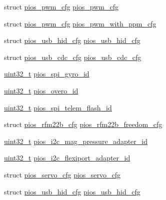 \begin{DoxyCompactItemize}
\item 
struct \hyperlink{structpios__pwm__cfg}{pios\-\_\-pwm\-\_\-cfg} \hyperlink{group___tau_labs_core_ga7587f8e174df90bef8cec1edfa9e14c1}{pios\-\_\-pwm\-\_\-cfg}
\item 
struct \hyperlink{structpios__pwm__cfg}{pios\-\_\-pwm\-\_\-cfg} \hyperlink{group___tau_labs_core_ga6a7a8338c617f18384f3b3c5678f5505}{pios\-\_\-pwm\-\_\-with\-\_\-ppm\-\_\-cfg}
\item 
struct \hyperlink{structpios__usb__hid__cfg}{pios\-\_\-usb\-\_\-hid\-\_\-cfg} \hyperlink{group___tau_labs_core_ga3665f6d3a2cccc431b55b9432291e94c}{pios\-\_\-usb\-\_\-hid\-\_\-cfg}
\item 
struct \hyperlink{structpios__usb__cdc__cfg}{pios\-\_\-usb\-\_\-cdc\-\_\-cfg} \hyperlink{group___tau_labs_core_ga05cc3e449d417c7f9097d2659e6f5ca3}{pios\-\_\-usb\-\_\-cdc\-\_\-cfg}
\item 
\hyperlink{stdint_8h_a435d1572bf3f880d55459d9805097f62}{uint32\-\_\-t} \hyperlink{group___tau_labs_core_gaa3af759a1b634a729e4688dc40026875}{pios\-\_\-spi\-\_\-gyro\-\_\-id}
\item 
\hyperlink{stdint_8h_a435d1572bf3f880d55459d9805097f62}{uint32\-\_\-t} \hyperlink{group___tau_labs_core_ga6068626ce5d15d09ba077204ea2fd43d}{pios\-\_\-overo\-\_\-id}
\item 
\hyperlink{stdint_8h_a435d1572bf3f880d55459d9805097f62}{uint32\-\_\-t} \hyperlink{group___tau_labs_core_gabcea731eedc7b51eae0e4074e35fc8c1}{pios\-\_\-spi\-\_\-telem\-\_\-flash\-\_\-id}
\item 
struct \hyperlink{structpios__rfm22b__cfg}{pios\-\_\-rfm22b\-\_\-cfg} \hyperlink{group___tau_labs_core_ga90c3bcd6b750abf0c59333f52475d875}{pios\-\_\-rfm22b\-\_\-freedom\-\_\-cfg}
\item 
\hyperlink{stdint_8h_a435d1572bf3f880d55459d9805097f62}{uint32\-\_\-t} \hyperlink{group___tau_labs_core_ga0bc1cddc7bfac02e5a765f1ff09ad29f}{pios\-\_\-i2c\-\_\-mag\-\_\-pressure\-\_\-adapter\-\_\-id}
\item 
\hyperlink{stdint_8h_a435d1572bf3f880d55459d9805097f62}{uint32\-\_\-t} \hyperlink{group___tau_labs_core_ga20b68de0b754d943d653d816aad86148}{pios\-\_\-i2c\-\_\-flexiport\-\_\-adapter\-\_\-id}
\item 
struct \hyperlink{structpios__servo__cfg}{pios\-\_\-servo\-\_\-cfg} \hyperlink{group___tau_labs_core_ga57a87ef16d7949a9cc3589efc8d88a28}{pios\-\_\-servo\-\_\-cfg}
\item 
struct \hyperlink{structpios__usb__hid__cfg}{pios\-\_\-usb\-\_\-hid\-\_\-cfg} \hyperlink{group___tau_labs_core_ga3665f6d3a2cccc431b55b9432291e94c}{pios\-\_\-usb\-\_\-hid\-\_\-cfg}

\end{DoxyCompactItemize}
